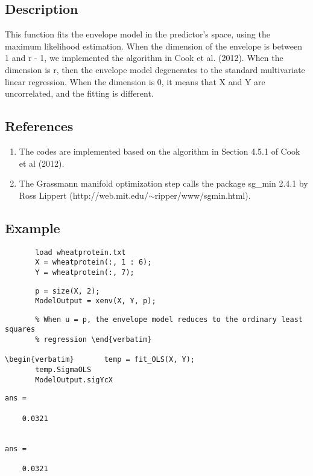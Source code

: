 \documentclass[a4paper,11pt,openany]{memoir}
\begin{document}
\subsection*{Description}

\begin{par}
This function fits the envelope model in the predictor's space, using the maximum likelihood estimation.  When the dimension of the envelope is between 1 and r - 1, we implemented the algorithm in Cook et al. (2012).  When the dimension is r, then the envelope model degenerates to the standard multivariate linear regression.  When the dimension is 0, it means that X and Y are uncorrelated, and the fitting is different.
\end{par} \vspace{1em}


\subsection*{References}

\begin{enumerate}
\setlength{\itemsep}{-1ex}
   \item The codes are implemented based on the algorithm in Section 4.5.1 of Cook et al (2012).
   \item The Grassmann manifold optimization step calls the package sg\_min 2.4.1 by Ross Lippert (http://web.mit.edu/$\sim$ripper/www/sgmin.html).
\end{enumerate}


\subsection*{Example}


\begin{verbatim}       load wheatprotein.txt
       X = wheatprotein(:, 1 : 6);
       Y = wheatprotein(:, 7);\end{verbatim}
    
\begin{verbatim}       p = size(X, 2);
       ModelOutput = xenv(X, Y, p);\end{verbatim}
    
\begin{verbatim}       % When u = p, the envelope model reduces to the ordinary least squares
       % regression \end{verbatim}
    
\begin{verbatim}       temp = fit_OLS(X, Y);
       temp.SigmaOLS
       ModelOutput.sigYcX\end{verbatim}
        \color{lightgray}\ttfamily \begin{verbatim}
ans =

    0.0321


ans =

    0.0321
    \end{verbatim} \rmfamily
\color{black}
\end{document}
